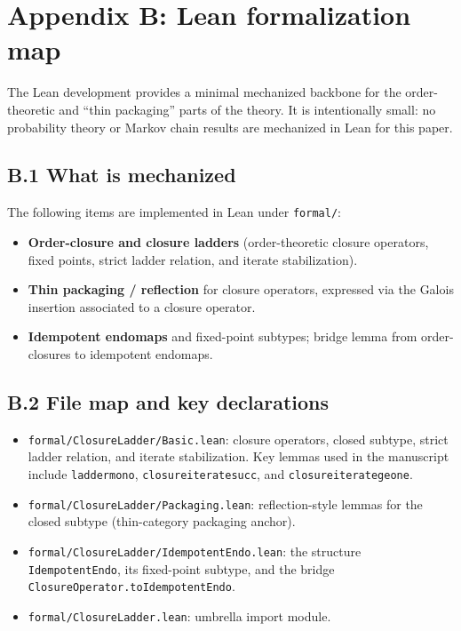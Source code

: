 \documentclass[11pt]{article}
\theoremstyle{remark}
\begin{document}
\section{Appendix B: Lean formalization map}
The Lean development provides a minimal mechanized backbone for the order-theoretic and
``thin packaging'' parts of the theory. It is intentionally small: no probability theory
or Markov chain results are mechanized in Lean for this paper.

\subsection*{B.1 What is mechanized}
The following items are implemented in Lean under \texttt{formal/}:

\begin{itemize}
  \item \textbf{Order-closure and closure ladders} (order-theoretic closure operators, fixed points, strict ladder relation, and iterate stabilization).
  \item \textbf{Thin packaging / reflection} for closure operators, expressed via the Galois insertion associated to a closure operator.
  \item \textbf{Idempotent endomaps} and fixed-point subtypes; bridge lemma from order-closures to idempotent endomaps.
\end{itemize}

\subsection*{B.2 File map and key declarations}
\begin{itemize}
  \item \texttt{formal/ClosureLadder/Basic.lean}:
    closure operators, closed subtype, strict ladder relation, and iterate stabilization.
    Key lemmas used in the manuscript include \texttt{ladder\*mono},
    \texttt{closure\*iterate\*succ}, and \texttt{closure\*iterate\*ge\*one}.
  \item \texttt{formal/ClosureLadder/Packaging.lean}:
    reflection-style lemmas for the closed subtype (thin-category packaging anchor).
  \item \texttt{formal/ClosureLadder/IdempotentEndo.lean}:
    the structure \texttt{IdempotentEndo}, its fixed-point subtype, and the bridge
    \texttt{ClosureOperator.toIdempotentEndo}.
  \item \texttt{formal/ClosureLadder.lean}:
    umbrella import module.
\end{itemize}
\end{document}

